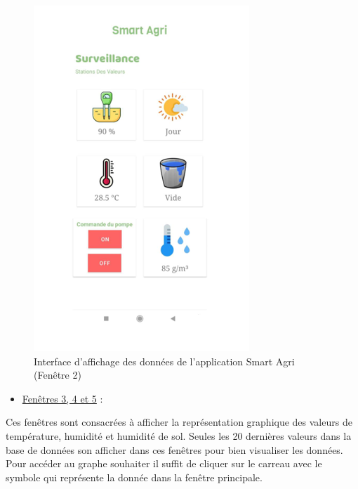 \begin{flushleft}
\begin{figure}[h]
		\includegraphics{chapitres/images/fenetre2.PNG}
		\caption{Interface d'affichage des données de l’application Smart Agri (Fenêtre 2)}
		\label{fig:labelname}
	\end{figure}
	\begin{itemize}
		\item \underline{Fenêtres 3, 4 et 5} :
	\end{itemize}
	Ces fenêtres sont consacrées à afficher la représentation graphique des valeurs de température, 
	humidité et humidité de sol. Seules les 20 dernières valeurs dans la base de données son afficher 
	dans ces fenêtres pour bien visualiser les données. Pour accéder au graphe souhaiter il suffit de 
	cliquer sur le carreau avec le symbole qui représente la donnée dans la fenêtre principale.
	\newpage
	\begin{figure}[h]
		\centering

\end{figure}
\end{flushleft}
